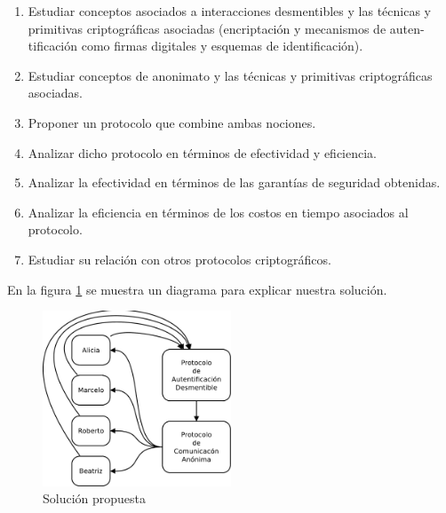 \begin{enumerate}
    \item Estudiar conceptos asociados a interacciones desmentibles y las técnicas y
          primitivas criptográficas asociadas (encriptación y mecanismos de auten-
          tificación como firmas digitales y esquemas de identificación).
    \item Estudiar conceptos de anonimato y las técnicas y primitivas criptográficas
          asociadas.
    \item Proponer un protocolo que combine ambas nociones.
    \item Analizar dicho protocolo en términos de efectividad y eficiencia.
    \item Analizar la efectividad en términos de las garantías de seguridad obtenidas.
    \item Analizar la eficiencia en términos de los costos en tiempo asociados al
          protocolo.
    \item Estudiar su relación con otros protocolos criptográficos.
\end{enumerate}


En la figura \ref{sigmix_simple} se muestra un diagrama para explicar nuestra solución.

\begin{figure}[hp]
    \centering
    \includegraphics[width=0.5\textwidth]{figs/sigmix_simple}
    \caption{Solución propuesta}
    \label{sigmix_simple}
\end{figure}

